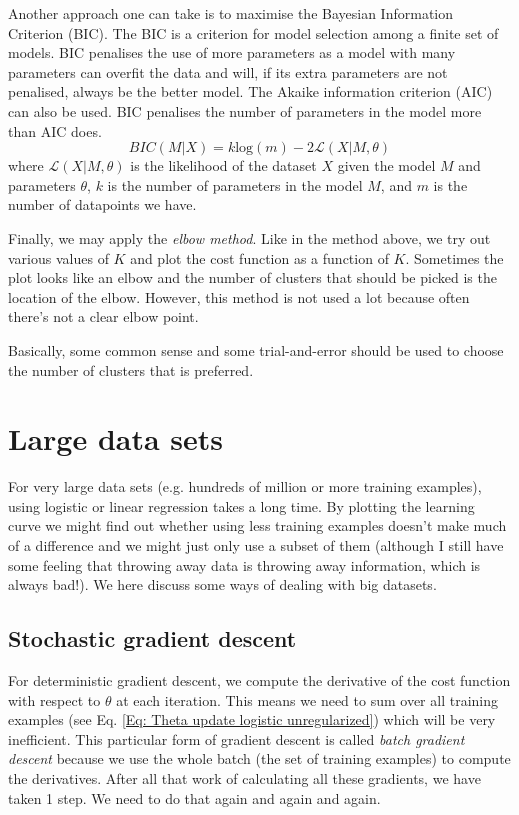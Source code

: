\documentclass[a4paper, 10pt,hidelinks]{article}
\begin{document}
Another approach one can take is to maximise the Bayesian Information Criterion (BIC). The BIC is a criterion for model selection among a finite set of models. BIC penalises the use of more parameters as a model with many parameters can overfit the data and will, if its extra parameters are not penalised, always be the better model. The Akaike information criterion (AIC) can also be used. BIC penalises the number of parameters in the model more than AIC does. 
\begin{equation}
BIC(M | X) = k \text{log}(m)- 2 \mathcal{L}(X|M, \theta)
\end{equation}
where 
$\mathcal{L}(X|M, \theta)$ is the likelihood of the dataset $X$ given the model $M$ and parameters $\theta$, $k$ is the number of parameters in the model $M$, and $m$ is the number of datapoints we have. 

Finally, we may apply the \emph{elbow method}. Like in the method above, we try out various values of $K$ and plot the cost function as a function of $K$. Sometimes the plot looks like an elbow and the number of clusters that should be picked is the location of the elbow. However, this method is not used a lot because often there's not a clear elbow point. 

Basically, some common sense and some trial-and-error should be used to choose the number of clusters that is preferred. 


\section{Large data sets}
For very large data sets (e.g. hundreds of million or more training examples), using logistic or linear regression takes a long time. By plotting the learning curve we might find out whether using less training examples doesn't make much of a difference and we might just only use a subset of them (although I still have some feeling that throwing away data is throwing away information, which is always bad!). We here discuss some ways of dealing with big datasets. 

\subsection{Stochastic gradient descent}
For deterministic gradient descent, we compute the derivative of the cost function with respect to $\theta$ at each iteration. This means we need to sum over all training examples (see Eq. \eqref{Eq: Theta update logistic unregularized}) which will be very inefficient. This particular form of gradient descent is called \emph{batch gradient descent} because we use the whole batch (the set of training examples) to compute the derivatives. After all that work of calculating all these gradients, we have taken 1 step. We need to do that again and again and again. 
\end{document}
